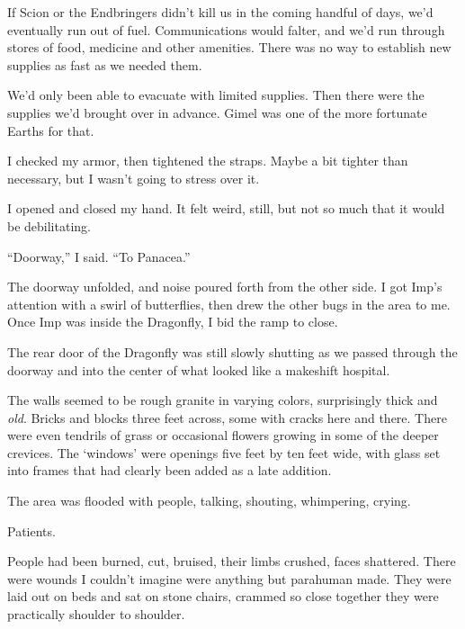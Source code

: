 If Scion or the Endbringers didn't kill us in the coming handful of days, we'd eventually run out of fuel.  Communications would falter, and we'd run through stores of food, medicine and other amenities.  There was no way to establish new supplies as fast as we needed them.



We'd only been able to evacuate with limited supplies.  Then there were the supplies we'd brought over in advance.  Gimel was one of the more fortunate Earths for that.



I checked my armor, then tightened the straps.  Maybe a bit tighter than necessary, but I wasn't going to stress over it.



I opened and closed my hand.  It felt weird, still, but not so much that it would be debilitating.



``Doorway,'' I said.  ``To Panacea.''



The doorway unfolded, and noise poured forth from the other side.  I got Imp's attention with a swirl of butterflies, then drew the other bugs in the area to me.  Once Imp was inside the Dragonfly, I bid the ramp to close.



The rear door of the Dragonfly was still slowly shutting as we passed through the doorway and into the center of what looked like a makeshift hospital.



The walls seemed to be rough granite in varying colors, surprisingly thick and \emph{old}.  Bricks and blocks three feet across, some with cracks here and there.  There were even tendrils of grass or occasional flowers growing in some of the deeper crevices.  The `windows' were openings five feet by ten feet wide, with glass set into frames that had clearly been added as a late addition.



The area was flooded with people, talking, shouting, whimpering, crying.



Patients.



People had been burned, cut, bruised, their limbs crushed, faces shattered.  There were wounds I couldn't imagine were anything but parahuman made.  They were laid out on beds and sat on stone chairs, crammed so close together they were practically shoulder to shoulder.



